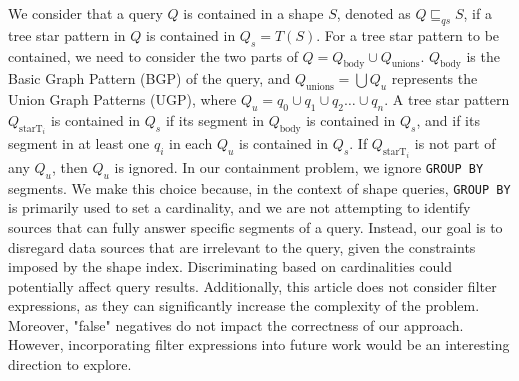 We consider that a query $Q$ is contained in a shape $S$, denoted as $Q \sqsubseteq_{qs} S$, if a tree star pattern in $Q$ is contained in $Q_s = T(S)$. 
For a tree star pattern to be contained, we need to consider the two parts of $Q = Q_{\text{body}} \cup Q_{\text{unions}}$.
$Q_{\text{body}}$ is the Basic Graph Pattern (BGP) of the query, and $Q_{\text{unions}} = \bigcup Q_u$ represents the Union Graph Patterns (UGP), where $Q_u = q_0 \cup q_1 \cup q_2 \dots \cup q_n$.
A tree star pattern $Q_{\text{starT}_i}$ is contained in $Q_s$ if its segment in $Q_{\text{body}}$ is contained in $Q_s$, and if its segment in at least one $q_i$ in each $Q_u$ is contained in $Q_s$. 
If $Q_{\text{starT}_i}$ is not part of any $Q_u$, then $Q_u$ is ignored.
In our containment problem, we ignore \texttt{GROUP BY} segments.
We make this choice because, in the context of shape queries, \texttt{GROUP BY} is primarily used to set a cardinality, and we are not attempting to identify sources that can fully answer specific segments of a query. 
Instead, our goal is to disregard data sources that are irrelevant to the query, given the constraints imposed by the shape index. 
Discriminating based on cardinalities could potentially affect query results.
Additionally, this article does not consider filter expressions, as they can significantly increase the complexity of the problem.
Moreover, "false" negatives do not impact the correctness of our approach. 
However, incorporating filter expressions into future work would be an interesting direction to explore.

